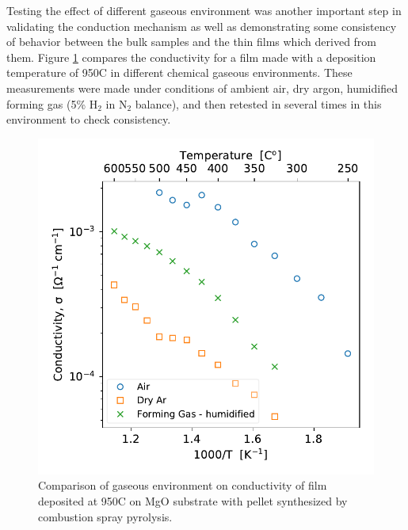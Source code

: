 
Testing the effect of different gaseous environment was another important step in validating the conduction mechanism as well as demonstrating some consistency of behavior between the bulk samples and the thin films which derived from them. Figure \ref{films:fig:arr:180201:gas} compares the conductivity for a film made with a deposition temperature of 950\textdegree C in different chemical gaseous environments. These measurements were made under conditions of ambient air, dry argon, humidified forming gas (5\% H$_2$ in N$_2$ balance), and then retested in several times in this environment to check consistency. 

\begin{figure}
    \centering
    \includegraphics{Figures/180821-film-180201-gas-change.pdf}
    \caption{Comparison of gaseous environment on conductivity of film deposited at 950\textdegree C on MgO substrate with pellet synthesized by combustion spray pyrolysis.}
    \label{films:fig:arr:180201:gas}
\end{figure}

